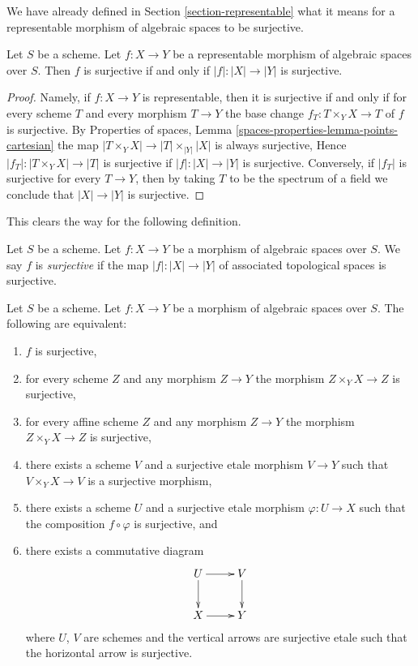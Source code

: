 \noindent
We have already defined in Section \ref{section-representable}
what it means for a representable morphism of algebraic spaces
to be surjective.

\begin{lemma}
\label{lemma-surjective-representable}
Let $S$ be a scheme. Let $f : X \to Y$ be a representable
morphism of algebraic spaces over $S$. Then
$f$ is surjective if and only if $|f| : |X| \to |Y|$ is surjective.
\end{lemma}

\begin{proof}
Namely, if $f : X \to Y$ is representable, then it is surjective if and only if
for every scheme $T$ and every morphism $T \to Y$ the base change
$f_T : T \times_Y X \to T$ of $f$ is surjective. By
Properties of spaces, Lemma \ref{spaces-properties-lemma-points-cartesian}
the map $|T \times_Y X| \to |T| \times_{|Y|} |X|$ is always surjective,
Hence $|f_T| : |T \times_Y X| \to |T|$ is surjective if $|f| : |X| \to |Y|$
is surjective. Conversely, if $|f_T|$ is surjective for every
$T \to Y$, then by taking $T$ to be the spectrum of a field we conclude that
$|X| \to |Y|$ is surjective.
\end{proof}

\noindent
This clears the way for the following definition.

\begin{definition}
\label{definition-surjective}
Let $S$ be a scheme. Let $f : X \to Y$ be a morphism of algebraic
spaces over $S$. We say $f$ is {\it surjective}
if the map $|f| : |X| \to |Y|$ of associated topological spaces
is surjective.
\end{definition}

\begin{lemma}
\label{lemma-surjective-local}
Let $S$ be a scheme.
Let $f : X \to Y$ be a morphism of algebraic spaces over $S$.
The following are equivalent:
\begin{enumerate}
\item $f$ is surjective,
\item for every scheme $Z$ and any morphism $Z \to Y$ the morphism
$Z \times_Y X \to Z$ is surjective,
\item for every affine scheme $Z$ and any morphism
$Z \to Y$ the morphism $Z \times_Y X \to Z$ is surjective,
\item there exists a scheme $V$ and a surjective etale morphism
$V \to Y$ such that $V \times_Y X \to V$ is a surjective morphism,
\item there exists a scheme $U$ and a surjective etale morphism
$\varphi : U \to X$ such that the composition $f \circ \varphi$
is surjective, and
\item there exists a commutative diagram
$$
\xymatrix{
U \ar[d] \ar[r] & V \ar[d] \\
X \ar[r] & Y
}
$$
where $U$, $V$ are schemes and the vertical arrows are surjective etale
such that the horizontal arrow is surjective.
\end{enumerate}
\end{lemma}

